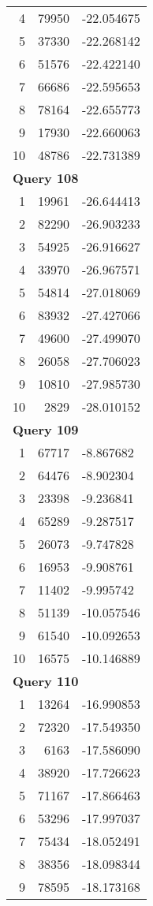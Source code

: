 \begin{longtable}[{p}]{@{}rrp{}@{}}
4 & 79950 & -22.054675 \\
5 & 37330 & -22.268142 \\
6 & 51576 & -22.422140 \\
7 & 66686 & -22.595653 \\
8 & 78164 & -22.655773 \\
9 & 17930 & -22.660063 \\
10 & 48786 & -22.731389 \\
\midrule
\multicolumn{3}{l}{\bfseries Query 108} \\
1 & 19961 & -26.644413 \\
2 & 82290 & -26.903233 \\
3 & 54925 & -26.916627 \\
4 & 33970 & -26.967571 \\
5 & 54814 & -27.018069 \\
6 & 83932 & -27.427066 \\
7 & 49600 & -27.499070 \\
8 & 26058 & -27.706023 \\
9 & 10810 & -27.985730 \\
10 & 2829 & -28.010152 \\
\midrule
\multicolumn{3}{l}{\bfseries Query 109} \\
1 & 67717 & -8.867682 \\
2 & 64476 & -8.902304 \\
3 & 23398 & -9.236841 \\
4 & 65289 & -9.287517 \\
5 & 26073 & -9.747828 \\
6 & 16953 & -9.908761 \\
7 & 11402 & -9.995742 \\
8 & 51139 & -10.057546 \\
9 & 61540 & -10.092653 \\
10 & 16575 & -10.146889 \\
\midrule
\multicolumn{3}{l}{\bfseries Query 110} \\
1 & 13264 & -16.990853 \\
2 & 72320 & -17.549350 \\
3 & 6163 & -17.586090 \\
4 & 38920 & -17.726623 \\
5 & 71167 & -17.866463 \\
6 & 53296 & -17.997037 \\
7 & 75434 & -18.052491 \\
8 & 38356 & -18.098344 \\
9 & 78595 & -18.173168 \\

\end{longtable}
